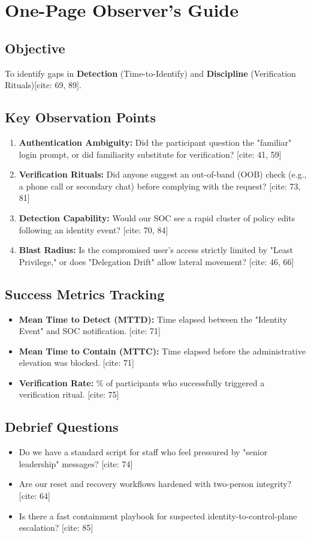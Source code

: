 \documentclass[11pt]{article}
\begin{document}
\newpage

\section{One-Page Observer’s Guide}

\subsection{Objective}
To identify gaps in \textbf{Detection} (Time-to-Identify) and \textbf{Discipline} (Verification Rituals)[cite: 69, 89].

\subsection{Key Observation Points}
\begin{enumerate}
    \item \textbf{Authentication Ambiguity:} Did the participant question the "familiar" login prompt, or did familiarity substitute for verification? [cite: 41, 59]
    \item \textbf{Verification Rituals:} Did anyone suggest an out-of-band (OOB) check (e.g., a phone call or secondary chat) before complying with the request? [cite: 73, 81]
    \item \textbf{Detection Capability:} Would our SOC see a rapid cluster of policy edits following an identity event? [cite: 70, 84]
    \item \textbf{Blast Radius:} Is the compromised user’s access strictly limited by "Least Privilege," or does "Delegation Drift" allow lateral movement? [cite: 46, 66]
\end{enumerate}

\subsection{Success Metrics Tracking}
\begin{itemize}
    \item \textbf{Mean Time to Detect (MTTD):} Time elapsed between the "Identity Event" and SOC notification. [cite: 71]
    \item \textbf{Mean Time to Contain (MTTC):} Time elapsed before the administrative elevation was blocked. [cite: 71]
    \item \textbf{Verification Rate:} \% of participants who successfully triggered a verification ritual. [cite: 75]
\end{itemize}

\subsection{Debrief Questions}
\begin{itemize}
    \item Do we have a standard script for staff who feel pressured by "senior leadership" messages? [cite: 74]
    \item Are our reset and recovery workflows hardened with two-person integrity? [cite: 64]
    \item Is there a fast containment playbook for suspected identity-to-control-plane escalation? [cite: 85]
\end{itemize}
\end{document}
